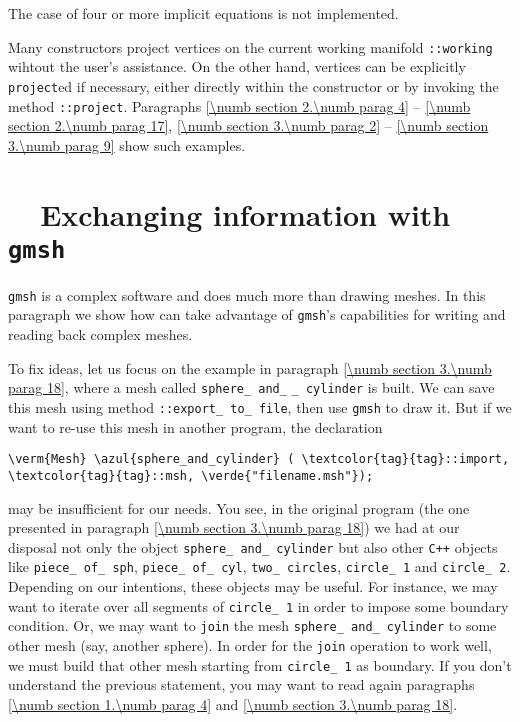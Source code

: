 The case of four or more implicit equations is not implemented.

Many {\small\tt{}} constructors project vertices on the current working manifold
{\small\tt{}::working} wihtout the user's assistance.
On the other hand, vertices can be explicitly {\small\tt project}ed if necessary,
either directly within the {\small\tt{}} constructor or by invoking the method
{\small\tt{}::project}.
Paragraphs \ref{\numb section 2.\numb parag 4} -- \ref{\numb section 2.\numb parag 17},
\ref{\numb section 3.\numb parag 2} -- \ref{\numb section 3.\numb parag 9} show such examples.


\section{~~Exchanging information with {\tt gmsh}}\label{\numb section 8.\numb parag 2}

{\small\tt gmsh} is a complex software and does much more than drawing meshes.
In this paragraph we show how {\maniFEM} can take advantage of {\small\tt gmsh}'s capabilities
for writing and reading back complex meshes.

To fix ideas, let us focus on the example in paragraph \ref{\numb section 3.\numb parag 18},
where a mesh called {\small\tt sphere\_\,and\_} {\small\tt\_\,cylinder} is built.
We can save this mesh using method {\small\tt{}::export\_\,to\_\,file}, then use
{\small\tt gmsh} to draw it.
But if we want to re-use this mesh in another {\maniFEM} program, the declaration

\begin{Verbatim}[commandchars=\\\{\},formatcom=\small\tt,
   baselinestretch=0.94,framesep=2mm                     ]
   \verm{Mesh} \azul{sphere_and_cylinder} ( \textcolor{tag}{tag}::import, \textcolor{tag}{tag}::msh, \verde{"filename.msh"});
\end{Verbatim}

\noindent may be insufficient for our needs.
You see, in the original program (the one presented in paragraph
\ref{\numb section 3.\numb parag 18}) we had at our disposal not only the {\small\tt{}}
object {\small\tt sphere\_\,and\_\,cylinder} but also other {\tt C++} objects like
{\small\tt piece\_\,of\_\,sph}, {\small\tt piece\_\,of\_\,cyl}, {\small\tt two\_\,circles},
{\small\tt circle\_\,1} and {\small\tt circle\_\,2}.
Depending on our intentions, these objects may be useful.
For instance, we may want to iterate over all segments of {\small\tt circle\_\,1} in order to
impose some boundary condition.
Or, we may want to {\small\tt join} the mesh {\small\tt sphere\_\,and\_\,cylinder} to some
other mesh (say, another sphere).
In order for the {\small\tt join} operation to work well, we must build that other
mesh starting from {\small\tt circle\_\,1} as boundary.
If you don't understand the previous statement, you may want to read again paragraphs
\ref{\numb section 1.\numb parag 4} and \ref{\numb section 3.\numb parag 18}.

